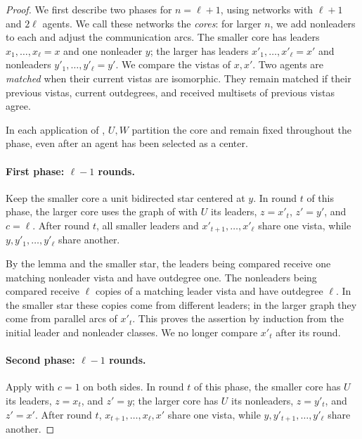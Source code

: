 \documentclass[11pt]{article}
\begin{document}
\begin{proof}
We first describe two phases for \(n=\ell+1\), using networks
with \(\ell+1\) and \(2\ell\) agents. We call these networks the
\emph{cores}: for larger \(n\), we add nonleaders to each and
adjust the communication arcs.
The smaller core has leaders \(x_1,\ldots,x_\ell=x\) and one
nonleader \(y\); the larger has leaders
\(x'_1,\ldots,x'_\ell=x'\) and nonleaders
\(y'_1,\ldots,y'_\ell=y'\). We compare the vistas of \(x,x'\).
Two agents are \emph{matched} when their current vistas are isomorphic.
They remain matched if their previous vistas, current outdegrees, and
received multisets of previous vistas agree.

In each application of , \(U,W\) partition
the core and remain fixed throughout the phase, even after an agent has
been selected as a center.

\paragraph{First phase: \(\ell-1\) rounds.}
Keep the smaller core a unit bidirected star centered at \(y\).
In round \(t\) of this phase, the larger core uses the graph of 
with \(U\) its leaders, \(z=x'_t\), \(z'=y'\), and \(c=\ell\).
After round \(t\), all smaller leaders and \(x'_{t+1},\ldots,x'_\ell\)
share one vista, while \(y,y'_1,\ldots,y'_\ell\) share another.

By the lemma and the smaller star, the leaders being compared receive one
matching nonleader vista and have outdegree one. The nonleaders being
compared receive \(\ell\)
copies of a matching leader vista and have outdegree \(\ell\).
In the smaller star these copies come from different leaders; in the
larger graph they come from parallel arcs of \(x'_t\).
This proves the assertion by induction from the initial leader and
nonleader classes. We no longer compare \(x'_t\) after its round.

\paragraph{Second phase: \(\ell-1\) rounds.}
Apply  with \(c=1\) on both sides.
In round \(t\) of this phase, the smaller core has \(U\) its leaders, \(z=x_t\),
and \(z'=y\); the larger core has \(U\) its nonleaders, \(z=y'_t\),
and \(z'=x'\).
After round \(t\), \(x_{t+1},\ldots,x_\ell,x'\) share one vista, while
\(y,y'_{t+1},\ldots,y'_\ell\) share another.


\end{proof}
\end{document}
